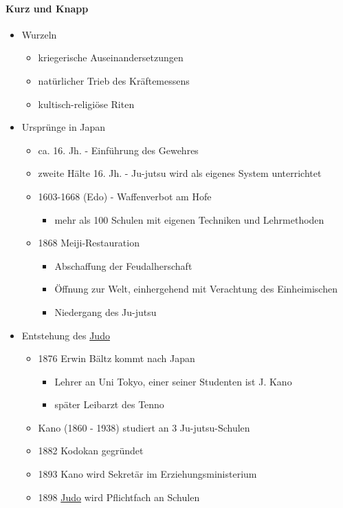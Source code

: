 \documentclass[justified, a4paper, notitlepage, captions=tableheading, nobib]{tufte-handout}
\begin{document}
\paragraph{Kurz und Knapp}
\label{sec:org4cea385}
\begin{itemize}
\item Wurzeln
\begin{itemize}
\item kriegerische Auseinandersetzungen
\item natürlicher Trieb des Kräftemessens
\item kultisch-religiöse Riten
\end{itemize}
\item Ursprünge in Japan
\begin{itemize}
\item ca. 16. Jh. - Einführung des Gewehres
\item zweite Hälte 16. Jh. - Ju-jutsu wird als eigenes System unterrichtet
\item 1603-1668 (Edo) - Waffenverbot am Hofe
\begin{itemize}
\item mehr als 100 Schulen mit eigenen Techniken und Lehrmethoden
\end{itemize}
\item 1868 Meiji-Restauration
\begin{itemize}
\item Abschaffung der Feudalherschaft
\item Öffnung zur Welt, einhergehend mit Verachtung des Einheimischen
\item Niedergang des Ju-jutsu
\end{itemize}
\end{itemize}
\item Entstehung des \hyperref[org39a3ee2]{Judo}
\begin{itemize}
\item 1876 Erwin Bältz kommt nach Japan
\begin{itemize}
\item Lehrer an Uni Tokyo, einer seiner Studenten ist J. Kano
\item später Leibarzt des Tenno
\end{itemize}
\item Kano (1860 - 1938) studiert an 3 Ju-jutsu-Schulen
\item 1882 Kodokan gegründet
\item 1893 Kano wird Sekretär im Erziehungsministerium
\item 1898 \hyperref[org39a3ee2]{Judo} wird Pflichtfach an Schulen

\end{itemize}
\end{itemize}
\end{document}

